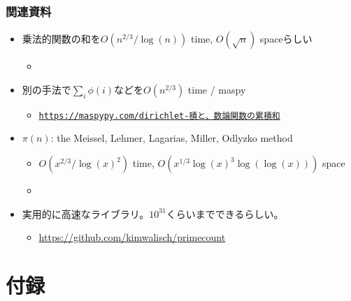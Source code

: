 \documentclass[
  lualatex,
  ja=standard,
  compress,
  hyperref={colorlinks, urlcolor=magenta, linkcolor=blue!55!black},
  dvipsnames,
  svgnames,
]{beamer}
\begin{document}
\begin{frame}
  \frametitle{関連資料}

  \begin{itemize}
  \item 乗法的関数の和を$O(n^{2/3}/\log(n))$ time, $O(\sqrt{n})$ spaceらしい
    \begin{itemize}
    \item {}
    \end{itemize}
  \item 別の手法で$\sum_i \phi(i)$などを$O(n^{2/3})$ time / maspy
    \begin{itemize}
    \item \href{https://maspypy.com/dirichlet-\%E7\%A9\%8D\%E3\%81\%A8\%E3\%80\%81\%E6\%95\%B0\%E8\%AB\%96\%E9\%96\%A2\%E6\%95\%B0\%E3\%81\%AE\%E7\%B4\%AF\%E7\%A9\%8D\%E5\%92\%8C}{\scriptsize\texttt{https://maspypy.com/dirichlet-積と、数論関数の累積和}}
    \end{itemize}
  \item $\pi(n)$: the Meissel, Lehmer, Lagarias, Miller, Odlyzko method
    \begin{itemize}
    \item $O(x^{2/3}/\log(x)^2)$ time, $O(x^{1/3}\log(x)^3\log(\log(x)))$ space
    \item {}
    \end{itemize}
  \item 実用的に高速なライブラリ。$10^{31}$くらいまでできるらしい。
    \begin{itemize}
    \item \url{https://github.com/kimwalisch/primecount}
    \end{itemize}
  \end{itemize}
\end{frame}

\begin{frame}
  \vspace{3em}
  \Thankyou
\end{frame}

\appendix

\section{付録}
\end{document}
